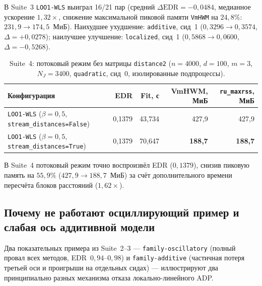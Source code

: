 \documentclass[11pt,a4paper]{article}
\numberwithin{equation}{section}
\theoremstyle{definition}
\theoremstyle{remark}
\newcommand{\code}[1]{\nolinkurl{#1}}
\begin{document}
В Suite~3 \texttt{LOO1-WLS} выиграл 16/21 пар (средний $\Delta\text{EDR} = -0{,}0484$, медианное ускорение $1{,}32\times$,
снижение максимальной пиковой памяти \texttt{VmHWM} на $24{,}8\%$: $231{,}9 \to 174{,}5$~МиБ).
Наихудшее ухудшение: \texttt{additive}, сид~1 ($0{,}3296 \to 0{,}3574$, $\Delta = +0{,}0278$);
наилучшее улучшение: \texttt{localized}, сид~1 ($0{,}5868 \to 0{,}0600$, $\Delta = -0{,}5268$).

\begin{table}[htbp]
\centering
\caption{Suite~4: потоковый режим без матрицы \texttt{distance2} ($n=4000$, $d=100$, $m=3$, $N_J=3400$, \texttt{quadratic}, сид~0, изолированные подпроцессы).}
\label{tab:suite4}
\footnotesize
\setlength{\tabcolsep}{5pt}
\begin{tabular}{@{}lrrrr@{}}
\toprule
Конфигурация & EDR & Fit, с & VmHWM, МиБ & \texttt{ru\_maxrss}, МиБ \\
\midrule
\texttt{LOO1-WLS} ($\beta=0{,}5$, \code{stream_distances=False}) & 0,1379 & 43,734 & 427,9 & 427,9 \\
\texttt{LOO1-WLS} ($\beta=0{,}5$, \code{stream_distances=True})  & 0,1379 & 70,647 & \textbf{188,7} & \textbf{188,7} \\
\bottomrule
\end{tabular}
\end{table}

В Suite~4 потоковый режим точно воспроизвёл EDR ($0{,}1379$), снизив пиковую память на $55{,}9\%$
($427{,}9 \to 188{,}7$~МиБ) за счёт дополнительного времени пересчёта блоков расстояний ($1{,}62\times$).

\subsection{Почему не работают осциллирующий пример и слабая ось аддитивной модели}
\label{sec:failing-examples}

Два показательных примера из Suite~2--3 — \texttt{family-oscillatory} (полный провал всех методов,
EDR~$0{,}94\text{--}0{,}98$) и \texttt{family-additive} (частичная потеря третьей оси и проигрыши на
отдельных сидах) — иллюстрируют два принципиально разных механизма отказа локально-линейного ADP.
\end{document}
